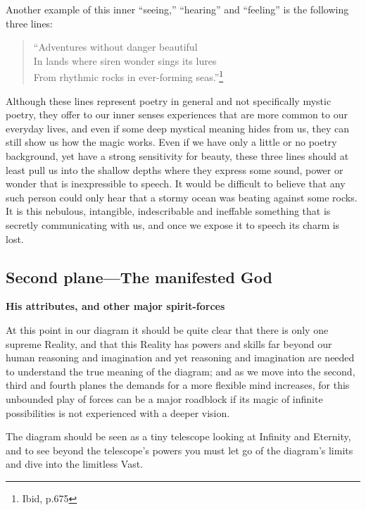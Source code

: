 \documentclass[12pt,a4paper]{book}
\begin{document}
Another example of this inner ``seeing,'' ``hearing'' and ``feeling''
is the following three lines:

\newpage
\begin{verse}
``Adventures without danger beautiful\\
In lands where siren wonder sings its lures\\
From rhythmic rocks in ever-forming seas.''\footnote{Ibid, p.675}
\end{verse}

Although these lines represent poetry in general and not specifically
mystic poetry, they offer to our inner senses experiences that are
more common to our everyday lives, and even if some deep mystical
meaning hides from us, they can still show us how the magic
works. Even if we have only a little or no poetry background, yet have
a strong sensitivity for beauty, these three lines should at least
pull us into the shallow depths where they express some sound, power
or wonder that is inexpressible to speech. It would be difficult to
believe that any such person could only hear that a stormy ocean was
beating against some rocks. It is this nebulous, intangible,
indescribable and ineffable something that is secretly communicating
with us, and once we expose it to speech its charm is lost.


\newpage
\begin{center}\section*{Second plane---The manifested God}\end{center}

\begin{center}{\bf His attributes, and other major spirit-forces}\end{center}



At this point in our diagram it should be quite clear that there is
only one supreme Reality, and that this Reality has powers and skills
far beyond our human reasoning and imagination and yet reasoning and
imagination are needed to understand the true meaning of the diagram;
and as we move into the second, third and fourth planes the demands
for a more flexible mind increases, for this unbounded play of forces
can be a major roadblock if its magic of infinite possibilities is not
experienced with a deeper vision.

The diagram should be seen as a tiny telescope looking at Infinity and
Eternity, and to see beyond the telescope's powers you must let go of
the diagram's limits and dive into the limitless Vast.
\end{document}
